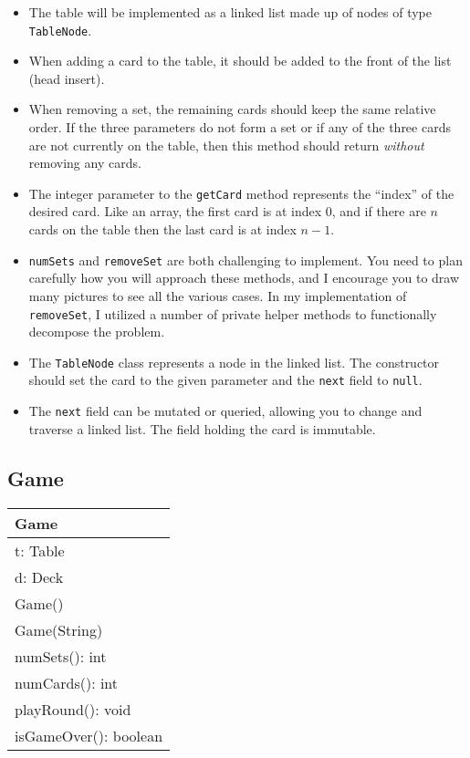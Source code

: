 \documentclass[11pt]{article}
\begin{document}
\begin{itemize}
\item The table will be implemented as a linked list made up of nodes of type
  {\tt TableNode}.

\item When adding a card to the table, it should be added to the front of the
  list (head insert).

\item When removing a set, the remaining cards should keep the same relative
  order.  If the three parameters do not form a set or if any of the three
  cards are not currently on the table, then this method should return {\em
    without} removing any cards.

\item The integer parameter to the {\tt getCard} method represents the
  ``index'' of the desired card.  Like an array, the first card is at index 0,
  and if there are $n$ cards on the table then the last card is at index $n-1$.

\item {\tt numSets} and {\tt removeSet} are both challenging to implement.  You
  need to plan carefully how you will approach these methods, and I encourage
  you to draw many pictures to see all the various cases.  In my implementation
  of {\tt removeSet}, I utilized a number of private helper methods to
  functionally decompose the problem.

\item The {\tt TableNode} class represents a node in the linked list.  The
  constructor should set the card to the given parameter and the {\tt next}
  field to {\tt null}.

\item The {\tt next} field can be mutated or queried, allowing you to change
  and traverse a linked list.  The field holding the card is immutable.
\end{itemize}

\subsection*{Game}

\begin{tabular}{|l|}
\hline
Game \\
\hline
t: Table\\
d: Deck\\
\hline
Game()\\
Game(String)\\
numSets(): int\\
numCards(): int\\
playRound(): void\\
isGameOver(): boolean\\
\hline
\end{tabular}
\end{document}
